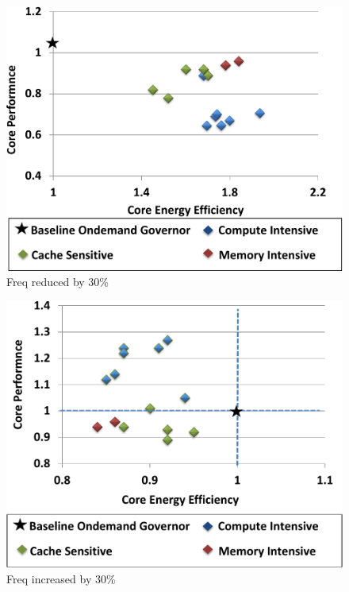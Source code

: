 \begin{figure}[h]
  \begin{center}
\includegraphics[width=\linewidth]{figs/ana-reduce-crop.pdf}
  \end{center}
  \vspace{-0.1in}
  \caption{Freq reduced by 30\%}
	\label{fig:reduce-freq}
\end{figure}


\begin{figure}[h]
  \begin{center}
\includegraphics[width=\linewidth]{figs/ana-increase-crop.pdf}
  \end{center}
  \vspace{-0.1in}
  \caption{Freq increased by 30\%}
	\label{fig:increase-freq}
\end{figure}




